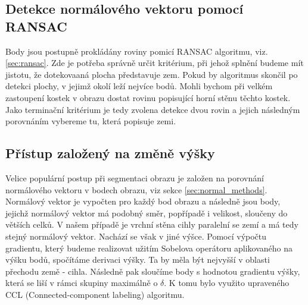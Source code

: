 \documentclass[twoside]{ctuthesis}
\begin{document}
\subsection{Detekce normálového vektoru pomocí RANSAC}
\label{sec:plane_ransac}
Body jsou postupně prokládány roviny pomicí RANSAC algoritmu, viz. \ref{sec:ransac}. Zde je potřeba správně určit kritérium, při jehož splnění budeme mít jistotu, že dotekovaaná plocha představuje zem. Pokud by algoritmus skončil po detekci plochy, v jejimž okolí leží nejvíce bodů. Mohli bychom při velkém zastoupení kostek v obrazu dostat rovinu popisující horní stěnu těchto kostek. Jako terminační kritérium je tedy zvolena detekce dvou rovin a jejich následným porovnáním vybereme tu, která popisuje zemi.

\subsection{Přístup založený na změně výšky}
\label{sec:sobel_normal}
Velice populární postup při segmentaci obrazu je založen na porovnání normálového vektoru v bodech obrazu, viz sekce \ref{sec:normal_methods}. Normálový vektor je vypočten pro každý bod obrazu a následně jsou body, jejichž normálový vektor má podobný směr, popřípadě i velikost, sloučeny do větších celků. V našem případě je vrchní stěna cihly paralelní se zemí a má tedy stejný normálový vektor. Nachází se však v jiné výšce. Pomocí výpočtu gradientu, který budeme realizovat užitím Sobelova operátoru aplikovaného na výšku bodů, spočítáme derivaci výšky. Ta by měla být nejvyšší v oblasti přechodu země - cihla. Následně pak sloučíme body s hodnotou gradientu výšky, která se liší v rámci skupiny maximálně o $\delta$. K tomu bylo využito upraveného CCL (Connected-component labeling) algoritmu. 
\end{document}
